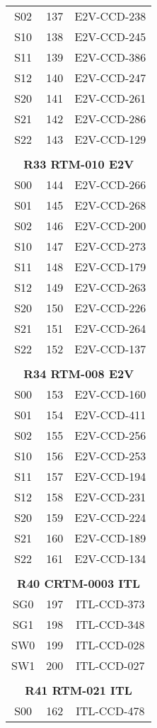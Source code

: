 \begin{longtable}{ccc}
  S02 & 137 & E2V-CCD-238 \\
  S10 & 138 & E2V-CCD-245 \\
  S11 & 139 & E2V-CCD-386 \\
  S12 & 140 & E2V-CCD-247 \\
  S20 & 141 & E2V-CCD-261 \\
  S21 & 142 & E2V-CCD-286 \\
  S22 & 143 & E2V-CCD-129 \\
 & & \\
\multicolumn{3}{c}{\bf R33  RTM-010  E2V} \\
\hline
  S00 & 144 & E2V-CCD-266 \\
  S01 & 145 & E2V-CCD-268 \\
  S02 & 146 & E2V-CCD-200 \\
  S10 & 147 & E2V-CCD-273 \\
  S11 & 148 & E2V-CCD-179 \\
  S12 & 149 & E2V-CCD-263 \\
  S20 & 150 & E2V-CCD-226 \\
  S21 & 151 & E2V-CCD-264 \\
  S22 & 152 & E2V-CCD-137 \\
 & & \\
\multicolumn{3}{c}{\bf R34  RTM-008  E2V} \\
\hline
  S00 & 153 & E2V-CCD-160 \\
  S01 & 154 & E2V-CCD-411 \\
  S02 & 155 & E2V-CCD-256 \\
  S10 & 156 & E2V-CCD-253 \\
  S11 & 157 & E2V-CCD-194 \\
  S12 & 158 & E2V-CCD-231 \\
  S20 & 159 & E2V-CCD-224 \\
  S21 & 160 & E2V-CCD-189 \\
  S22 & 161 & E2V-CCD-134 \\
 & & \\
\multicolumn{3}{c}{\bf R40  CRTM-0003  ITL} \\
\hline
  SG0 & 197 & ITL-CCD-373 \\
  SG1 & 198 & ITL-CCD-348 \\
  SW0 & 199 & ITL-CCD-028 \\
  SW1 & 200 & ITL-CCD-027 \\
 & & \\
\multicolumn{3}{c}{\bf R41  RTM-021  ITL} \\
\hline
  S00 & 162 & ITL-CCD-478 \\

\end{longtable}
